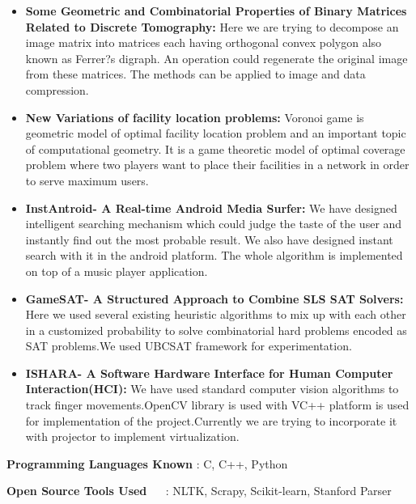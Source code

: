 \documentclass{res}
\begin{document}
\begin{resume}
\begin{itemize}[leftmargin=-2.1em]
 
 \item {\bf Some Geometric and Combinatorial Properties of Binary Matrices Related to
Discrete Tomography:}
 Here we are trying to decompose an image matrix into matrices
each having orthogonal convex polygon also known as Ferrer?s digraph. An operation could
regenerate the original image from these matrices. The methods can be applied to image and
data compression.  

  \item {\bf New Variations of facility location problems:} Voronoi game is geometric model of optimal
  facility location problem and an important topic of computational geometry. It is a game
  theoretic model of optimal coverage problem where two players want to place their facilities
  in a network in order to serve maximum users.
  
  \item {\bf InstAntroid- A Real-time Android Media Surfer:} We have designed intelligent searching
  mechanism which could judge the taste of the user and instantly find out the most probable
  result. We also have designed instant search with it in the android platform. The whole
  algorithm is implemented on top of a music player application.
  
  \item 
 {\bf GameSAT- A Structured Approach to Combine SLS SAT Solvers:} Here we used several existing heuristic algorithms to mix up with each other in a customized probability to solve combinatorial hard problems encoded as SAT problems.We used UBCSAT framework for experimentation.
  
 \item {\bf ISHARA- A Software Hardware Interface for Human Computer Interaction(HCI):} We have used standard computer vision algorithms to track finger movements.OpenCV library is used with VC++ platform is used for implementation of the project.Currently we are trying to incorporate it with projector to implement virtualization. 
 

\end{itemize}           



 
{\bf Programming Languages Known}    :  C, C++, Python\\ 
\vspace{-0.2in}

{\bf Open Source Tools Used}   $\quad$              : NLTK, Scrapy, Scikit-learn, Stanford Parser

\vspace{-0.1in}

\end{resume}
\end{document}

